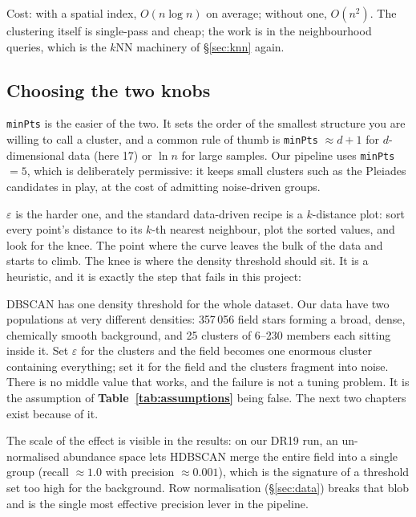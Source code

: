 Cost: with a spatial index, $O(n \log n)$ on average; without one, $O(n^2)$.
The clustering itself is single-pass and cheap; the work is in the
neighbourhood queries, which is the $k$NN machinery of \S\ref{sec:knn} again.

\subsection{Choosing the two knobs}

\texttt{minPts} is the easier of the two. It sets the order of the smallest
structure you are willing to call a cluster, and a common rule of thumb is
\texttt{minPts} $\approx d+1$ for $d$-dimensional data (here 17) or
$\ln n$ for large samples. Our pipeline uses \texttt{minPts} $=5$, which is
deliberately permissive: it keeps small clusters such as the Pleiades
candidates in play, at the cost of admitting noise-driven groups.

$\varepsilon$ is the harder one, and the standard data-driven recipe is a
$k$-distance plot: sort every point's distance to its $k$-th nearest neighbour,
plot the sorted values, and look for the knee. The point where the curve leaves
the bulk of the data and starts to climb. The knee is where the density
threshold should sit. It is a heuristic, and it is exactly the step that fails
in this project:

\begin{issues} DBSCAN has one density threshold
for the whole dataset. Our data have two populations at very different
densities: 357\,056 field stars forming a broad, dense, chemically smooth
background, and 25 clusters of 6--230 members each sitting inside it. Set
$\varepsilon$ for the clusters and the field becomes one enormous cluster
containing everything; set it for the field and the clusters fragment into
noise. There is no middle value that works, and the failure is not a tuning
problem. It is the assumption of \textbf{Table~\ref{tab:assumptions}} being
false. The next two chapters exist because of it.
\end{issues}

The scale of the effect is visible in the results: on our DR19 run, an
un-normalised abundance space lets HDBSCAN merge the entire field into a
single group (recall $\approx 1.0$ with precision $\approx 0.001$), which is
the signature of a threshold set too high for the background. Row
normalisation (\S\ref{sec:data}) breaks that blob and is the single most
effective precision lever in the pipeline.

